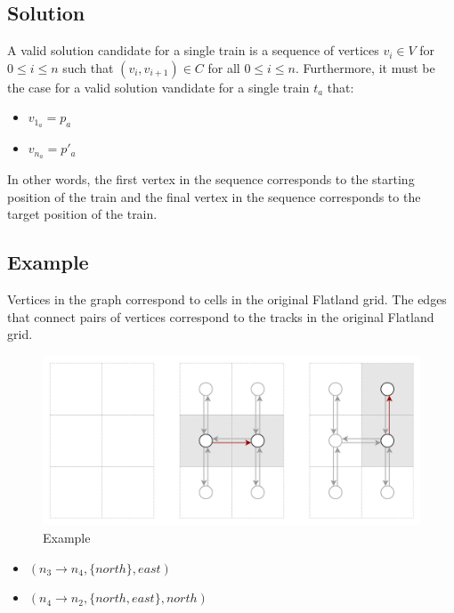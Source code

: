 \subsection{Solution}\label{sec:solution}
A valid solution candidate for a single train is a sequence of vertices $v_i \in V$ for $0 \leq i \leq n$ such that $(v_i,v_{i+1}) \in C$ for all $0 \leq i \leq n$.  Furthermore, it must be the case for a valid solution vandidate for a single train $t_a$ that:
\begin{itemize}
	\item $v_{1_a} = p_a$
	\item $v_{n_a} = p'_a$
\end{itemize}
\noindent In other words, the first vertex in the sequence corresponds to the starting position of the train and the final vertex in the sequence corresponds to the target position of the train.

\subsection{Example}\label{sec:example}
Vertices in the graph correspond to cells in the original Flatland grid.  The edges that connect pairs of vertices correspond to the tracks in the original Flatland grid.  

\begin{figure}
\centering
        \includegraphics[width=\linewidth]{img/edges.png}
    \caption{Example}
    \label{fig:verticalcell}
\end{figure}

\begin{itemize}
	\item $(n_3 \rightarrow n_4, \{north\}, east)$
	\item $(n_4 \rightarrow n_2, \{north, east\}, north)$
\end{itemize}
